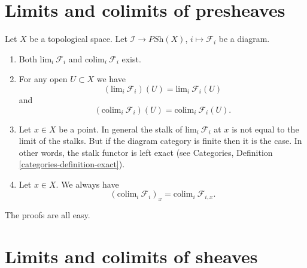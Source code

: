 \section{Limits and colimits of presheaves}
\label{section-limits-presheaves}

\noindent
Let $X$ be a topological space.
Let $\mathcal{I} \to \textit{PSh}(X)$, $i \mapsto \mathcal{F}_i$
be a diagram.
\begin{enumerate}
\item Both $\text{lim}_i\ \mathcal{F}_i$ and $\text{colim}_i\ \mathcal{F}_i$
exist.
\item For any open $U \subset X$ we have
$$
(\text{lim}_i\ \mathcal{F}_i)(U) = \text{lim}_i\ \mathcal{F}_i(U)
$$
and
$$
(\text{colim}_i\ \mathcal{F}_i)(U) =
\text{colim}_i\ \mathcal{F}_i(U).
$$
\item Let $x \in X$ be a point. In general the stalk of
$\text{lim}_i\ \mathcal{F}_i$ at $x$ is not equal to
the limit of the stalks. But if the diagram category is finite
then it is the case. In other words, the stalk functor is
left exact (see Categories, Definition \ref{categories-definition-exact}).
\item Let $x \in X$. We always have
$$
(\text{colim}_i\ \mathcal{F}_i)_x =
\text{colim}_i\ \mathcal{F}_{i,x}.
$$
\end{enumerate}
The proofs are all easy.

\section{Limits and colimits of sheaves}
\label{section-limits-sheaves}


